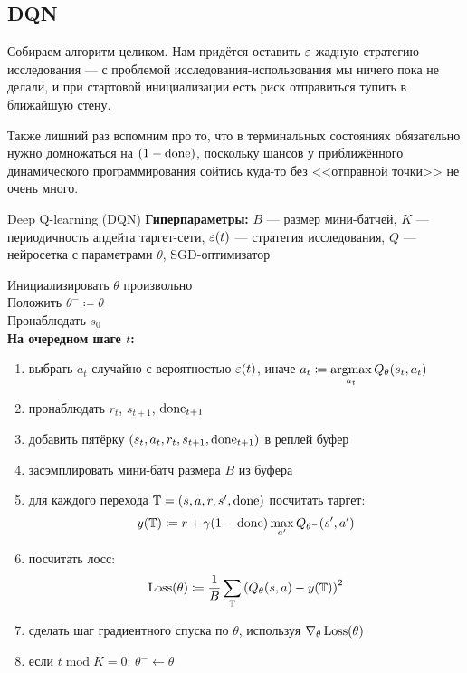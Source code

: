 \subsection{DQN}

Собираем алгоритм целиком. Нам придётся оставить $\varepsilon$-жадную стратегию исследования --- с проблемой исследования-использования мы ничего пока не делали, и при стартовой инициализации есть риск отправиться тупить в ближайшую стену. 

Также лишний раз вспомним про то, что в терминальных состояниях обязательно нужно домножаться на $(1 - \mathrm{done})$, поскольку шансов у приближённого динамического программирования сойтись куда-то без <<отправной точки>> не очень много. 

\begin{algorithm}[label = DQNalgorithm]{Deep Q-learning (DQN)}
\textbf{Гиперпараметры:} $B$ --- размер мини-батчей, $K$ --- периодичность апдейта таргет-сети, $\varepsilon(t)$ --- стратегия исследования, $Q$ --- нейросетка с параметрами $\theta$, SGD-оптимизатор

\vspace{0.3cm}
Инициализировать $\theta$ произвольно \\
Положить $\theta^- \coloneqq \theta$ \\
Пронаблюдать $s_0$ \\
\textbf{На очередном шаге $t$:}
\begin{enumerate}
    \item выбрать $a_t$ случайно с вероятностью $\varepsilon(t)$, иначе $a_t \coloneqq \mathop{\mathrm{argmax}}\limits_{a_t} Q_{\theta}(s_t, a_t)$
    \item пронаблюдать $r_t$,  $s_{t+1}$, $\mathrm{done}_{t+1}$
    \item добавить пятёрку $(s_t, a_t, r_t, s_{t+1}, \mathrm{done}_{t+1})$ в реплей буфер
    \item засэмплировать мини-батч размера $B$ из буфера
    \item для каждого перехода $\mathbb{T} = (s, a, r, s', \mathrm{done})$ посчитать таргет:
    $$y(\mathbb{T} ) \coloneqq r + \gamma (1 - \mathrm{done}) \max\limits_{a'} Q_{\theta^{-}}(s', a')$$
    \item посчитать лосс:
    $$\operatorname{Loss}(\theta) \coloneqq \frac{1}{B}\sum_{\mathbb{T}} \left( Q_{\theta}(s, a) - y(\mathbb{T} ) \right) ^2$$
    \item сделать шаг градиентного спуска по $\theta$, используя $\nabla_\theta \operatorname{Loss}(\theta)$
    \item если $t \operatorname{mod} K = 0$: $\theta^- \gets \theta$
\end{enumerate}
\end{algorithm}


